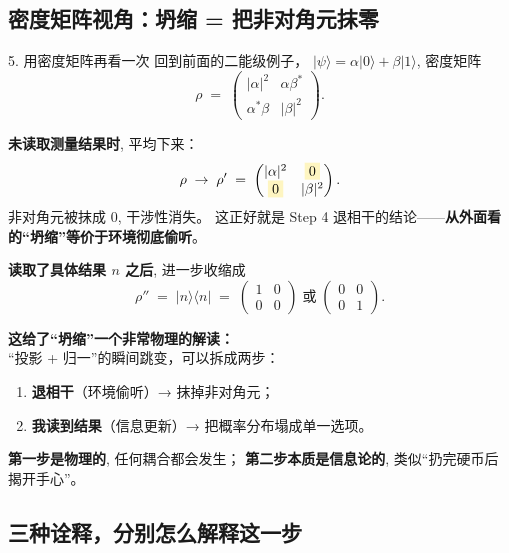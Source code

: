 \documentclass[11pt,a4paper]{ctexart}
\newcommand{\hl}[1]{\colorbox{Goldenrod!28}{$\displaystyle #1$}}
\begin{document}
\subsection{密度矩阵视角：坍缩 = 把非对角元抹零}

\begin{stepblock}{5. 用密度矩阵再看一次}
回到前面的二能级例子，
$\lvert\psi\rangle = \alpha\lvert 0\rangle + \beta\lvert 1\rangle$, 密度矩阵
\[
  \rho \;=\;
  \begin{pmatrix}
    |\alpha|^2 & \alpha\beta^{*} \\
    \alpha^{*}\beta & |\beta|^2
  \end{pmatrix}.
\]

\textbf{未读取测量结果时}, 平均下来：
\[
  \rho \;\to\; \rho' \;=\;
  \begin{pmatrix}
    |\alpha|^2 & \hl{0} \\
    \hl{0} & |\beta|^2
  \end{pmatrix}.
\]
非对角元被抹成 $0$, 干涉性消失。
这正好就是 Step 4 退相干的结论——\textbf{从外面看的``坍缩''等价于环境彻底偷听}。

\smallskip
\textbf{读取了具体结果 $n$ 之后}, 进一步收缩成
\[
  \rho'' \;=\; \lvert n\rangle\langle n\rvert
  \;=\;
  \begin{pmatrix}
    1 & 0 \\ 0 & 0
  \end{pmatrix}\;\text{或}\;\begin{pmatrix}
    0 & 0 \\ 0 & 1
  \end{pmatrix}.
\]

\smallskip
\textbf{这给了``坍缩''一个非常物理的解读：}\\
``投影 + 归一''的瞬间跳变，可以拆成两步：
\begin{enumerate}
  \item \textbf{退相干}（环境偷听）→ 抹掉非对角元；
  \item \textbf{我读到结果}（信息更新）→ 把概率分布塌成单一选项。
\end{enumerate}
\textbf{第一步是物理的}, 任何耦合都会发生；
\textbf{第二步本质是信息论的}, 类似``扔完硬币后揭开手心''。
\end{stepblock}

\subsection{三种诠释，分别怎么解释这一步}
\end{document}
